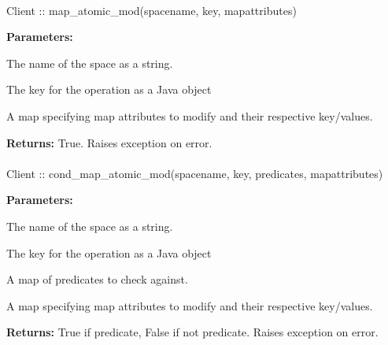 \paragraph{}
\label{api:java:map_atomic_mod}
\begin{javacode}
Client :: map_atomic_mod(spacename, key, mapattributes)
\end{javacode}


\noindent\textbf{Parameters:}
\begin{description}[labelindent=\widthof{{\code{mapattributes}}},leftmargin=*,noitemsep,nolistsep,align=right]
\item[\code{spacename}] The name of the space as a string.
\item[\code{key}] The key for the operation as a Java object
\item[\code{mapattributes}] A map specifying map attributes to modify and their respective key/values.
\end{description}

\noindent\textbf{Returns:}
True.  Raises exception on error.

\paragraph{}
\label{api:java:cond_map_atomic_mod}
\begin{javacode}
Client :: cond_map_atomic_mod(spacename, key, predicates, mapattributes)
\end{javacode}


\noindent\textbf{Parameters:}
\begin{description}[labelindent=\widthof{{\code{mapattributes}}},leftmargin=*,noitemsep,nolistsep,align=right]
\item[\code{spacename}] The name of the space as a string.
\item[\code{key}] The key for the operation as a Java object
\item[\code{predicates}] A map of predicates to check against.
\item[\code{mapattributes}] A map specifying map attributes to modify and their respective key/values.
\end{description}

\noindent\textbf{Returns:}
True if predicate, False if not predicate.  Raises exception on error.

